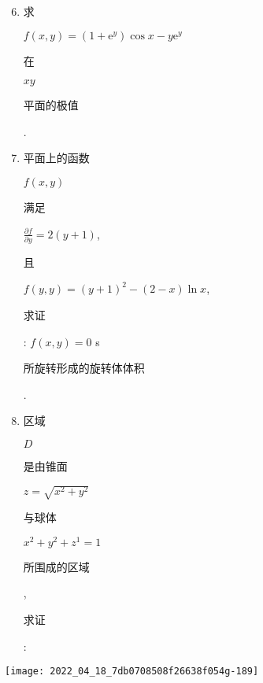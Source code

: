 \documentclass[10pt]{article}
\begin{document}
\begin{enumerate}
  \setcounter{enumi}{5}
  \item \begin{CJK}{UTF8}{mj}求\end{CJK} $f(x, y)=\left(1+\mathrm{e}^{y}\right) \cos x-y \mathrm{e}^{y}$ \begin{CJK}{UTF8}{mj}在\end{CJK} $x y$ \begin{CJK}{UTF8}{mj}平面的极值\end{CJK}.

  \item \begin{CJK}{UTF8}{mj}平面上的函数\end{CJK} $f(x, y)$ \begin{CJK}{UTF8}{mj}满足\end{CJK} $\frac{\partial f}{\partial y}=2(y+1)$, \begin{CJK}{UTF8}{mj}且\end{CJK} $f(y, y)=(y+1)^{2}-(2-x) \ln x$, \begin{CJK}{UTF8}{mj}求证\end{CJK}: $f(x, y)=0$ s \begin{CJK}{UTF8}{mj}所旋转形成的旋转体体积\end{CJK}.

  \item \begin{CJK}{UTF8}{mj}区域\end{CJK} $D$ \begin{CJK}{UTF8}{mj}是由锥面\end{CJK} $z=\sqrt{x^{2}+y^{2}}$ \begin{CJK}{UTF8}{mj}与球体\end{CJK} $x^{2}+y^{2}+z^{1}=1$ \begin{CJK}{UTF8}{mj}所围成的区域\end{CJK}, \begin{CJK}{UTF8}{mj}求证\end{CJK}:

\end{enumerate}
\texttt{[image: 2022\_04\_18\_7db0708508f26638f054g-189]}
\end{document}
